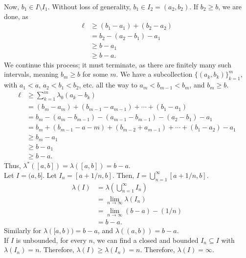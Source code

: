 \documentclass[9pt]{extarticle}
\begin{document}
\begin{description}
      Now, $b_1 \in I\setminus I_1$. Without loss of generality, $b_1\in I_2 = (a_2,b_2)$. If $b_2 \geq b$, we are done, as 
      \begin{align*}
        \ell &\geq (b_1-a_1) + (b_2 - a_2)\\
             &= b_2 - (a_2 - b_1) - a_1\\
             &\geq b-a_1 \\
             &\geq b-a.
      \end{align*}
      We continue this process; it must terminate, as there are finitely many such intervals, meaning $b_m\geq b$ for some $m$. We have a subcollection $\{(a_k,b_k)\}_{k=1}^{m}$, with $a_1 < a$, $a_2 < b_1 < b_2$, etc. all the way to $a_m < b_{m-1} < b_m$, and $b_m \geq b$.
      \begin{align*}
        \ell &\geq \sum_{k=1}^{m}\lambda_0(a_k - b_k)\\
             &= (b_m - a_m) + \left(b_{m-1} - a_{m-1}\right) + \cdots + \left(b_1 - a_1\right)\\
             &= b_m - (a_m - b_{m-1}) - (a_{m-1} - b_{m-1}) - (a_2 - b_1) - a_1\\
             &= b_{m} + (b_{m-1} - a-m) + \left(b_{m-2} + a_{m-1}\right) + \cdots + (b_1 - a_2) - a_1\\
             &\geq b_m - a_1\\
             &\geq b-a_1\\
             &\geq b-a.
      \end{align*}
      Thus, $\lambda^{\ast}([a,b]) = \lambda([a,b]) = b-a$.\\

      Let $I = (a,b]$. Let $I_n = [a+1/n,b]$. Then, $I = \bigcup_{n=1}^{\infty}[a+1/n,b]$.
      \begin{align*}
        \lambda(I) &= \lambda\left(\bigcup_{n=1}^{\infty}I_n\right)\\
                   &= \lim_{n\rightarrow\infty} \lambda(I_n)\\
                   &= \lim_{n\rightarrow\infty} (b-a)-(1/n)\\
                   &= b-a.
      \end{align*}
      Similarly for $\lambda([a,b)) = b-a$, and $\lambda((a,b)) = b-a$.\\

      If $I$ is unbounded, for every $n$, we can find a closed and bounded $I_n\subseteq I$ with $\lambda(I_n) = n$. Therefore, $\lambda(I) \geq \lambda(I_n) = n$. Therefore, $\lambda(I) = \infty$.
  \end{description}
\end{document}
